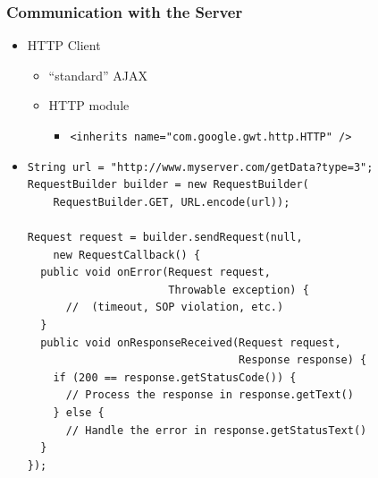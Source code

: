 \documentclass[10pt,table, xcolor=pdflatex]{beamer}
\begin{document}
\begin{frame}[fragile]\frametitle{Communication with the Server}
	\begin{itemize}
		\item HTTP Client
          \begin{itemize}
        	\item ``standard'' AJAX
            \item HTTP module
              \begin{itemize}
            	\item \texttt{<inherits name="com.google.gwt.http.HTTP" />}
              \end{itemize}
          \end{itemize}
        \medskip
        \item[]
        	\lstset{language=Java, basicstyle=\footnotesize\ttfamily}
            \begin{lstlisting}
String url = "http://www.myserver.com/getData?type=3";
RequestBuilder builder = new RequestBuilder(
    RequestBuilder.GET, URL.encode(url));

Request request = builder.sendRequest(null, 
    new RequestCallback() {
  public void onError(Request request, 
                      Throwable exception) {
      //  (timeout, SOP violation, etc.)     
  }
  public void onResponseReceived(Request request, 
                                 Response response) {
    if (200 == response.getStatusCode()) {
      // Process the response in response.getText()
    } else {
      // Handle the error in response.getStatusText()
  }
});     
            \end{lstlisting}
	\end{itemize}
\end{frame}
\end{document}
